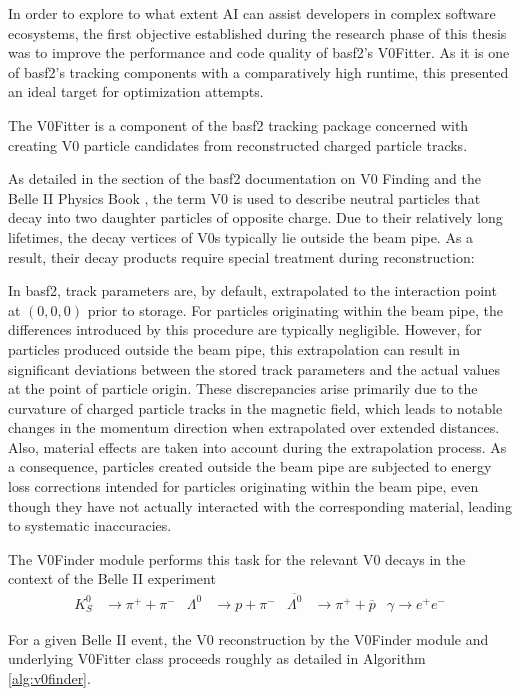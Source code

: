 In order to explore to what extent AI can assist developers in complex software ecosystems, the first objective established during the research phase of this thesis was to improve the performance and code quality of basf2's V0Fitter.
As it is one of basf2's tracking components with a comparatively high runtime, this presented an ideal target for optimization attempts.

The V0Fitter \cite{v0fitter-doxygen} is a component of the basf2 tracking package concerned with creating V0 particle candidates from reconstructed charged particle tracks.

As detailed in the section of the basf2 documentation on V0 Finding \cite{v0finding-basf2} and the Belle II Physics Book \cite{b2-physics-book}, the term V0 is used to describe neutral particles that decay into two daughter particles of opposite charge.
Due to their relatively long lifetimes, the decay vertices of V0s typically lie outside the beam pipe. As a result, their decay products require special treatment during reconstruction:

In basf2, track parameters are, by default, extrapolated to the interaction point at $(0,0,0)$ prior to storage.
For particles originating within the beam pipe, the differences introduced by this procedure are typically negligible.
However, for particles produced outside the beam pipe, this extrapolation can result in significant deviations between the stored track parameters and the actual values at the point of particle origin.
These discrepancies arise primarily due to the curvature of charged particle tracks in the magnetic field, which leads to notable changes in the momentum direction when extrapolated over extended distances.
Also, material effects are taken into account during the extrapolation process.
As a consequence, particles created outside the beam pipe are subjected to energy loss corrections intended for particles originating within the beam pipe, even though they have not actually interacted with the corresponding material, leading to systematic inaccuracies.

The V0Finder module \cite{v0finder-doxygen} performs this task for the relevant V0 decays in the context of the Belle II experiment
\begin{align*}
  K^0_S                & \to \pi^+ + \pi^-        &
  \Lambda^0            & \to p + \pi^-            &
  \overline{\Lambda^0} & \to \pi^+ + \overline{p} &
  \gamma \to e^+ e^-
\end{align*}

For a given Belle II event, the V0 reconstruction by the V0Finder module and underlying V0Fitter class proceeds roughly as detailed in Algorithm \ref{alg:v0finder}.

